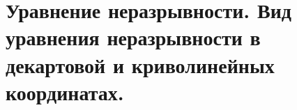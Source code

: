\chapter{Уравнение неразрывности. Вид уравнения неразрывности в декартовой и
криволинейных координатах.}

\newpage
